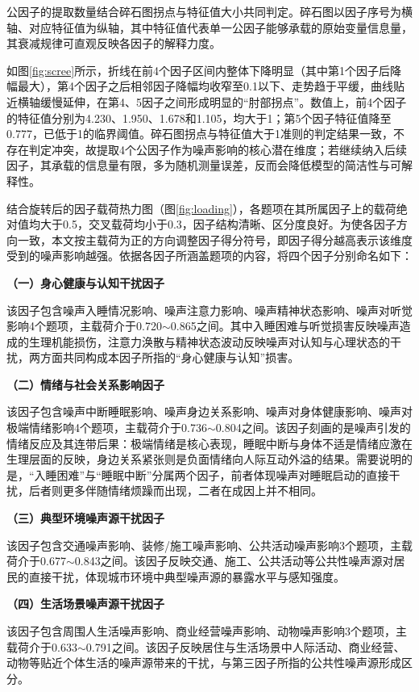 公因子的提取数量结合碎石图拐点与特征值大小共同判定。碎石图以因子序号为横轴、对应特征值为纵轴，其中特征值代表单一公因子能够承载的原始变量信息量，其衰减规律可直观反映各因子的解释力度。

如图\ref{fig:scree}所示，折线在前4个因子区间内整体下降明显（其中第1个因子后降幅最大），第4个因子之后相邻因子降幅均收窄至0.1以下、走势趋于平缓，曲线贴近横轴缓慢延伸，在第4、5因子之间形成明显的“肘部拐点”。数值上，前4个因子的特征值分别为4.230、1.950、1.678和1.105，均大于1；第5个因子特征值降至0.777，已低于1的临界阈值。碎石图拐点与特征值大于1准则的判定结果一致，不存在判定冲突，故提取4个公因子作为噪声影响的核心潜在维度；若继续纳入后续因子，其承载的信息量有限，多为随机测量误差，反而会降低模型的简洁性与可解释性。


结合旋转后的因子载荷热力图（图\ref{fig:loading}），各题项在其所属因子上的载荷绝对值均大于0.5，交叉载荷均小于0.3，因子结构清晰、区分度良好。为使各因子方向一致，本文按主载荷为正的方向调整因子得分符号，即因子得分越高表示该维度受到的噪声影响越强。依据各因子所涵盖题项的内容，将四个因子分别命名如下：

\textbf{（一）身心健康与认知干扰因子}

该因子包含噪声入睡情况影响、噪声注意力影响、噪声精神状态影响、噪声对听觉影响4个题项，主载荷介于0.720$\sim$0.865之间。其中入睡困难与听觉损害反映噪声造成的生理机能损伤，注意力涣散与精神状态波动反映噪声对认知与心理状态的干扰，两方面共同构成本因子所指的“身心健康与认知”损害。

\textbf{（二）情绪与社会关系影响因子}

该因子包含噪声中断睡眠影响、噪声身边关系影响、噪声对身体健康影响、噪声对极端情绪影响4个题项，主载荷介于0.736$\sim$0.804之间。该因子刻画的是噪声引发的情绪反应及其连带后果：极端情绪是核心表现，睡眠中断与身体不适是情绪应激在生理层面的反映，身边关系紧张则是负面情绪向人际互动外溢的结果。需要说明的是，“入睡困难”与“睡眠中断”分属两个因子，前者体现噪声对睡眠启动的直接干扰，后者则更多伴随情绪烦躁而出现，二者在成因上并不相同。

\textbf{（三）典型环境噪声源干扰因子}

该因子包含交通噪声影响、装修/施工噪声影响、公共活动噪声影响3个题项，主载荷介于0.677$\sim$0.843之间。该因子反映交通、施工、公共活动等公共性噪声源对居民的直接干扰，体现城市环境中典型噪声源的暴露水平与感知强度。

\textbf{（四）生活场景噪声源干扰因子}

该因子包含周围人生活噪声影响、商业经营噪声影响、动物噪声影响3个题项，主载荷介于0.633$\sim$0.791之间。该因子反映居住与生活场景中人际活动、商业经营、动物等贴近个体生活的噪声源带来的干扰，与第三因子所指的公共性噪声源形成区分。

